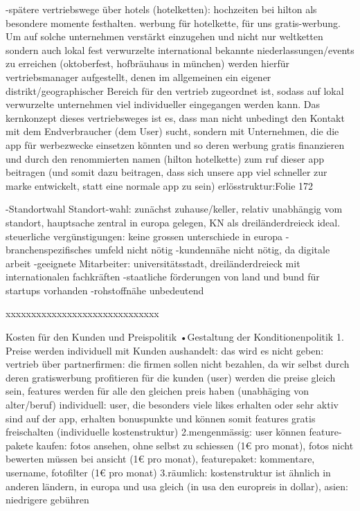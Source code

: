  -spätere vertriebswege über hotels (hotelketten): hochzeiten bei hilton als besondere momente festhalten.
 werbung für hotelkette, für uns gratis-werbung. Um auf solche unternehmen verstärkt einzugehen und nicht nur weltketten
 sondern auch lokal fest verwurzelte international bekannte niederlassungen/events zu erreichen (oktoberfest, hofbräuhaus in münchen)
 werden hierfür vertriebsmanager aufgestellt, denen im allgemeinen ein eigener distrikt/geographischer Bereich für den vertrieb zugeordnet ist,
 sodass auf lokal verwurzelte unternehmen viel individueller eingegangen werden kann. 
 Das kernkonzept dieses vertriebsweges ist es, dass man nicht unbedingt den Kontakt mit dem Endverbraucher (dem User) sucht, sondern mit Unternehmen,
 die die app für werbezwecke einsetzen könnten und so deren werbung gratis finanzieren und durch den renommierten namen (hilton hotelkette) zum
 ruf dieser app beitragen (und somit dazu beitragen, dass sich unsere app viel schneller zur marke entwickelt, statt eine normale app zu sein)
 erlösstruktur:Folie 172
 
 -Standortwahl
Standort-wahl: zunächst zuhause/keller, relativ unabhängig vom standort, hauptsache zentral in europa gelegen, KN als dreiländerdreieck ideal.
steuerliche vergünstigungen: keine grossen unterschiede in europa
-branchenspezifisches umfeld nicht nötig
-kundennähe nicht nötig, da digitale arbeit
-geeignete Mitarbeiter: universitätsstadt, dreiländerdreieck mit internationalen fachkräften
-staatliche förderungen von land und bund für startups vorhanden
-rohstoffnähe unbedeutend

 xxxxxxxxxxxxxxxxxxxxxxxxxxxxxx
 


Kosten für den Kunden und Preispolitik
•Gestaltung der Konditionenpolitik
1. Preise werden individuell mit Kunden aushandelt:
das wird es nicht geben:
vertrieb über partnerfirmen: die firmen sollen nicht bezahlen, da wir selbst durch deren gratiswerbung profitieren
für die kunden (user) werden die preise gleich sein, features werden für alle den gleichen preis haben (unabhäging von alter/beruf)
individuell: user, die besonders viele likes erhalten oder sehr aktiv sind auf der app, erhalten bonuspunkte und können somit features gratis freischalten (individuelle kostenstruktur)
2.mengenmässig: user können feature-pakete kaufen: fotos ansehen, ohne selbst zu schiessen (1€ pro monat), fotos nicht bewerten müssen bei ansicht (1€ pro monat), featurepaket: kommentare, username, fotofilter (1€ pro monat)
3.räumlich: kostenstruktur ist ähnlich in anderen ländern, in europa und usa gleich (in usa den europreis in dollar), asien: niedrigere gebühren


